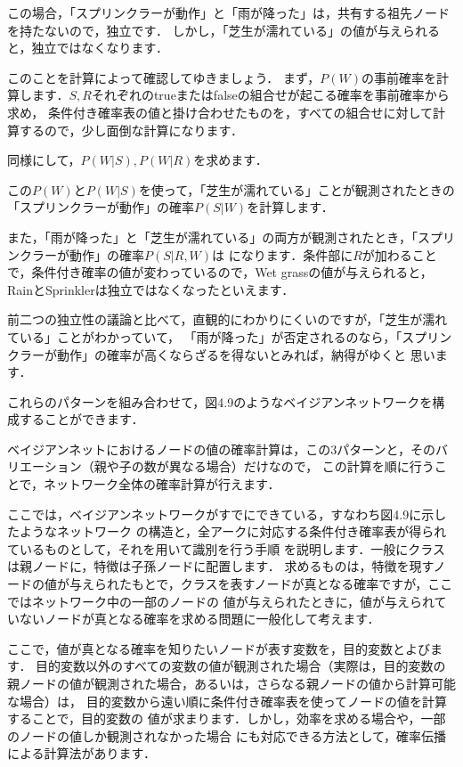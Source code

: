 この場合，「スプリンクラーが動作」と「雨が降った」は，共有する祖先ノードを持たないので，独立です．
しかし，「芝生が濡れている」の値が与えられると，独立ではなくなります．

このことを計算によって確認してゆきましょう．
まず，$P(W)$の事前確率を計算します．$S,R$それぞれのtrueまたはfalseの組合せが起こる確率を事前確率から求め，
条件付き確率表の値と掛け合わせたものを，すべての組合せに対して計算するので，少し面倒な計算になります．


同様にして，$P(W|S), P(W|R)$を求めます．



この$P(W)$と$P(W|S)$を使って，「芝生が濡れている」ことが観測されたときの「スプリンクラーが動作」の確率$P(S|W)$を計算します．


また，「雨が降った」と「芝生が濡れている」の両方が観測されたとき，「スプリンクラーが動作」の確率$P(S|R,W)$は
になります．条件部に$R$が加わることで，条件付き確率の値が変わっているので，Wet grassの値が与えられると，RainとSprinklerは独立ではなくなったといえます．

前二つの独立性の議論と比べて，直観的にわかりにくいのですが，「芝生が濡れている」ことがわかっていて，
「雨が降った」が否定されるのなら，「スプリンクラーが動作」の確率が高くならざるを得ないとみれば，納得がゆくと
思います．



これらのパターンを組み合わせて，図4.9のようなベイジアンネットワークを構成することができます．


ベイジアンネットにおけるノードの値の確率計算は，この3パターンと，そのバリエーション（親や子の数が異なる場合）だけなので，
この計算を順に行うことで，ネットワーク全体の確率計算が行えます．


ここでは，ベイジアンネットワークがすでにできている，すなわち図4.9に示したようなネットワーク
の構造と，全アークに対応する条件付き確率表が得られているものとして，それを用いて識別を行う手順
を説明します．一般にクラスは親ノードに，特徴は子孫ノードに配置します．
求めるものは，特徴を現すノードの値が与えられたもとで，クラスを表すノードが真となる確率ですが，ここではネットワーク中の一部のノードの
値が与えられたときに，値が与えられていないノードが真となる確率を求める問題に一般化して考えます．

ここで，値が真となる確率を知りたいノードが表す変数を，目的変数とよびます．
目的変数以外のすべての変数の値が観測された場合（実際は，目的変数の親ノードの値が観測された場合，あるいは，さらなる親ノードの値から計算可能な場合）は，
目的変数から遠い順に条件付き確率表を使ってノードの値を計算することで，目的変数の
値が求まります．しかし，効率を求める場合や，一部のノードの値しか観測されなかった場合
にも対応できる方法として，確率伝播による計算法があります．

